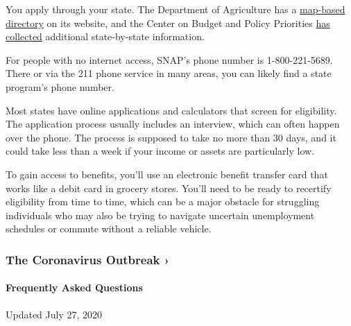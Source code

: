 You apply through your state. The Department of Agriculture has a
\href{https://www.fns.usda.gov/snap/state-directory}{map-based
directory} on its website, and the Center on Budget and Policy
Priorities
\href{https://www.cbpp.org/research/food-assistance/snap-state-by-state-data-fact-sheets-and-resources}{has
collected} additional state-by-state information.

For people with no internet access, SNAP's phone number is
1-800-221-5689. There or via the 211 phone service in many areas, you
can likely find a state program's phone number.

Most states have online applications and calculators that screen for
eligibility. The application process usually includes an interview,
which can often happen over the phone. The process is supposed to take
no more than 30 days, and it could take less than a week if your income
or assets are particularly low.

To gain access to benefits, you'll use an electronic benefit transfer
card that works like a debit card in grocery stores. You'll need to be
ready to recertify eligibility from time to time, which can be a major
obstacle for struggling individuals who may also be trying to navigate
uncertain unemployment schedules or commute without a reliable vehicle.

\href{https://www.nytimes.com/news-event/coronavirus?action=click\&pgtype=Article\&state=default\&region=MAIN_CONTENT_3\&context=storylines_faq}{}

\hypertarget{the-coronavirus-outbreak-}{%
\subsubsection{The Coronavirus Outbreak
›}\label{the-coronavirus-outbreak-}}

\hypertarget{frequently-asked-questions}{%
\paragraph{Frequently Asked
Questions}\label{frequently-asked-questions}}

Updated July 27, 2020

